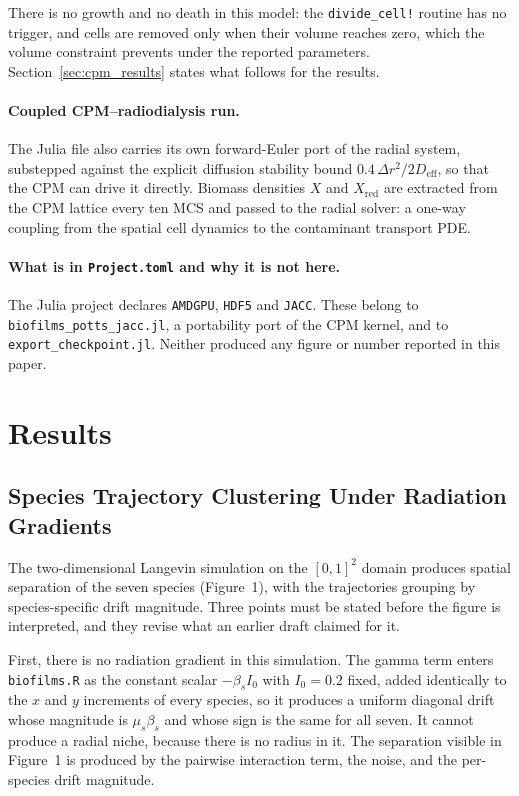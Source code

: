 \documentclass[11pt]{article}
\begin{document}
There is no growth and no death in this model: the \texttt{divide\_cell!} routine has no trigger,
and cells are removed only when their volume reaches zero, which the volume constraint prevents
under the reported parameters. Section~\ref{sec:cpm_results} states what follows for the results.

\paragraph{Coupled CPM--radiodialysis run.}
The Julia file also carries its own forward-Euler port of the radial system, substepped against the
explicit diffusion stability bound $0.4\,\Delta r^2 / 2D_{\mathrm{eff}}$, so that the CPM can drive
it directly. Biomass densities $X$ and $X_{\mathrm{red}}$ are extracted from the CPM lattice every
ten MCS and passed to the radial solver: a one-way coupling from the spatial cell dynamics to the
contaminant transport PDE.

\paragraph{What is in \texttt{Project.toml} and why it is not here.}
The Julia project declares \texttt{AMDGPU}, \texttt{HDF5} and \texttt{JACC}. These belong to
\texttt{biofilms\_potts\_jacc.jl}, a portability port of the CPM kernel, and to
\texttt{export\_checkpoint.jl}. Neither produced any figure or number reported in this paper.

\section{Results}

\subsection{Species Trajectory Clustering Under Radiation Gradients}

The two-dimensional Langevin simulation on the $[0,1]^2$ domain produces spatial separation of the
seven species (Figure~1), with the trajectories grouping by species-specific drift magnitude.
Three points must be stated before the figure is interpreted, and they revise what an earlier
draft claimed for it.

First, there is no radiation gradient in this simulation. The gamma term enters
\texttt{biofilms.R} as the constant scalar $-\beta_s I_0$ with $I_0 = 0.2$ fixed, added identically
to the $x$ and $y$ increments of every species, so it produces a uniform diagonal drift whose
magnitude is $\mu_s\beta_s$ and whose sign is the same for all seven. It cannot produce a radial
niche, because there is no radius in it. The separation visible in Figure~1 is produced by the
pairwise interaction term, the noise, and the per-species drift magnitude.
\end{document}

